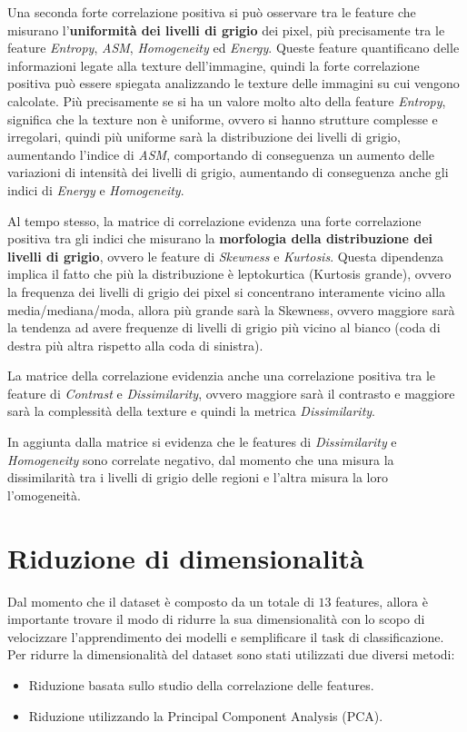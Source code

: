 Una seconda forte correlazione positiva si può osservare tra le feature che
misurano l'\textbf{uniformità dei livelli di grigio} dei pixel, più precisamente
tra le feature \textit{Entropy}, \textit{ASM}, \textit{Homogeneity} ed
\textit{Energy}. Queste feature quantificano delle informazioni legate alla
texture dell'immagine, quindi la forte correlazione positiva può essere spiegata
analizzando le texture delle immagini su cui vengono calcolate. Più precisamente
se si ha un valore molto alto della feature \textit{Entropy}, significa che la
texture non è uniforme, ovvero si hanno strutture complesse e irregolari, quindi
più uniforme sarà la distribuzione dei livelli di grigio, aumentando l'indice
di \textit{ASM}, comportando di conseguenza un aumento delle variazioni di intensità
dei livelli di grigio, aumentando di conseguenza anche gli indici di \textit{Energy}
e \textit{Homogeneity}.

Al tempo stesso, la matrice di correlazione evidenza una forte correlazione positiva
tra gli indici che misurano la \textbf{morfologia della distribuzione dei livelli
      di grigio}, ovvero le feature di \textit{Skewness} e \textit{Kurtosis}.
Questa dipendenza implica il fatto che più la distribuzione è leptokurtica
(Kurtosis grande), ovvero la frequenza dei livelli di grigio dei pixel si
concentrano interamente vicino alla media/mediana/moda, allora più grande sarà
la Skewness, ovvero maggiore sarà la tendenza ad avere frequenze di livelli di
grigio più vicino al bianco (coda di destra più altra rispetto alla coda di
sinistra).

La matrice della correlazione evidenzia anche una correlazione positiva tra le
feature di \textit{Contrast} e \textit{Dissimilarity}, ovvero maggiore sarà il
contrasto e maggiore sarà la complessità della texture e quindi la metrica
\textit{Dissimilarity}.

In aggiunta dalla matrice si evidenza che le features di \textit{Dissimilarity}
e \textit{Homogeneity} sono correlate negativo, dal momento che una misura la
dissimilarità tra i livelli di grigio delle regioni e l'altra misura la loro
l'omogeneità.
\section{Riduzione di dimensionalità} \label{sec:riduzone_di_dimensionalità}
Dal momento che il dataset è composto da un totale di $13$ features, allora
è importante trovare il modo di ridurre la sua dimensionalità con lo scopo di
velocizzare l'apprendimento dei modelli e semplificare il task di classificazione.
Per ridurre la dimensionalità del dataset sono stati utilizzati due diversi metodi:
\begin{itemize}
      \item Riduzione basata sullo studio della correlazione delle features.
      \item Riduzione utilizzando la Principal Component Analysis (PCA).
\end{itemize}
